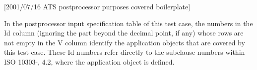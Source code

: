 [2001/07/16 ATS postprocessor purposes covered boilerplate]

    In the postprocessor input specification table of this test case, the
numbers in the Id column (ignoring the part beyond the decimal point, if any)
whose rows are not empty in the V column identify the application objects
that are covered by this test case. These Id numbers refer directly to
the subclause numbers within ISO 10303-\theAPpartno, 4.2, where the
application object is defined.
\par

\endinput
